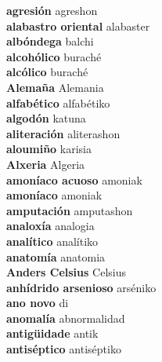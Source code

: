 \textbf{ agresión  } agreshon \\
\textbf{ alabastro oriental  } alabaster \\
\textbf{ albóndega  } balchi \\
\textbf{ alcohólico  } buraché \\
\textbf{ alcólico  } buraché \\
\textbf{ Alemaña  } Alemania \\
\textbf{ alfabético  } alfabétiko \\
\textbf{ algodón  } katuna \\
\textbf{ aliteración  } aliterashon \\
\textbf{ aloumiño  } karisia \\
\textbf{ Alxeria  } Algeria \\
\textbf{ amoníaco acuoso  } amoniak \\
\textbf{ amoníaco  } amoniak \\
\textbf{ amputación  } amputashon \\
\textbf{ analoxía  } analogia \\
\textbf{ analítico  } analítiko \\
\textbf{ anatomía  } anatomia \\
\textbf{ Anders Celsius  } Celsius \\
\textbf{ anhídrido arsenioso  } arséniko \\
\textbf{ ano novo  } di \\
\textbf{ anomalía  } abnormalidad \\
\textbf{ antigüidade  } antik \\
\textbf{ antiséptico  } antiséptiko \\
